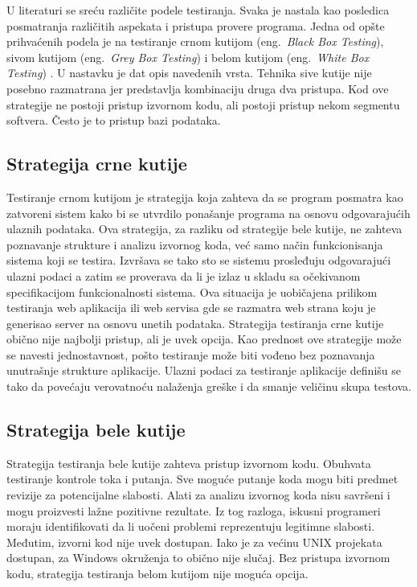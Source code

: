 \documentclass[a4paper]{article}
\begin{document}
{U literaturi se sreću različite podele testiranja. Svaka je nastala kao posledica posmatranja različitih aspekata i pristupa provere programa. Jedna od opšte prihvaćenih podela je na testiranje crnom kutijom (eng.~{\em Black Box Testing}), sivom kutijom (eng.~{\em Grey Box Testing}) i belom kutijom (eng.~{\em White Box Testing}) \cite{fuzzing}. U nastavku je dat opis navedenih vrsta. Tehnika sive kutije nije posebno razmatrana jer predstavlja kombinaciju druga dva pristupa. Kod ove strategije ne postoji pristup izvornom kodu, ali postoji pristup nekom segmentu softvera. Često je to pristup bazi podataka.

\subsection{Strategija crne kutije}
\label{subsec:crna_kutija}
Testiranje crnom kutijom je strategija koja zahteva da se program posmatra kao zatvoreni sistem kako bi se utvrdilo ponašanje programa na osnovu odgovarajućih ulaznih podataka. Ova strategija, za razliku od strategije bele kutije, ne zahteva poznavanje strukture i analizu izvornog koda, već samo način funkcionisanja sistema koji se testira. Izvršava se tako sto se sistemu prosleđuju odgovarajući ulazni podaci a zatim se proverava da li je izlaz u skladu sa očekivanom specifikacijom funkcionalnosti sistema. Ova situacija je uobičajena prilikom testiranja web aplikacija ili web servisa gde se razmatra web strana koju je generisao server na osnovu unetih podataka. Strategija testiranja crne kutije obično nije najbolji pristup, ali je uvek opcija. Kao prednost ove strategije može se navesti jednostavnost, pošto testiranje može biti vođeno bez poznavanja unutrašnje strukture aplikacije. Ulazni podaci za testiranje aplikacije definišu se tako da povećaju verovatnoću nalaženja greške i da smanje veličinu skupa testova.

\subsection{Strategija bele kutije}
\label{subsec:bela_kutija}
Strategija testiranja bele kutije zahteva pristup izvornom kodu. Obuhvata testiranje kontrole toka i putanja. Sve moguće putanje koda mogu biti predmet revizije za potencijalne slabosti. Alati za analizu izvornog koda nisu savršeni i mogu proizvesti lažne pozitivne rezultate. Iz tog razloga, iskusni programeri moraju identifikovati da li uočeni problemi reprezentuju legitimne slabosti. Međutim, izvorni kod nije uvek dostupan. Iako je za većinu UNIX projekata dostupan, za Windows okruženja to obično nije slučaj. Bez pristupa izvornom kodu, strategija testiranja belom kutijom nije moguća opcija.

}
\end{document}
